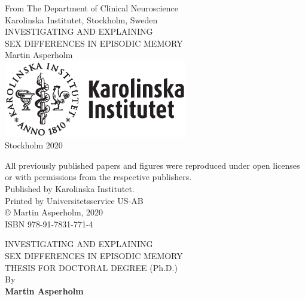 ﻿\documentclass[12pt,twoside,]{article}
\begin{document}
\sloppy %

\newpage
\thispagestyle{empty}
\begin{center}
\vspace*{25mm}
From The Department of Clinical Neuroscience \\
Karolinska Institutet, Stockholm, Sweden \\
\vspace{30mm}
{\Large INVESTIGATING AND EXPLAINING} \\
\vspace{2mm}
{\Large SEX DIFFERENCES IN EPISODIC MEMORY} \\
\vspace{5mm}
Martin Asperholm \\
\vspace{40mm}
\includegraphics[width=8cm]{Logo/KI-Logo_pos.eps} \\
Stockholm 2020
\end{center}

\newpage
\thispagestyle{empty}
\mbox{}
\vfill
\begin{flushleft}
	\noindent All previously published papers and figures were reproduced under open licenses or with permissions from the respective publishers. \\
	\vspace{2mm}
	\noindent Published by Karolinska Institutet. \\
	\vspace{2mm}
	\noindent Printed by Universitetsservice US-AB \\
	\vspace{2mm}
	\noindent © Martin Asperholm, 2020 \\
	\vspace{2mm}
	\noindent ISBN 978-91-7831-771-4
\end{flushleft}

\newpage
\thispagestyle{empty}
\vspace*{0mm}

\begin{flushleft}
	{\Large INVESTIGATING AND EXPLAINING \\ SEX DIFFERENCES IN EPISODIC MEMORY} \\
	\vspace{\baselineskip}
	{\Large THESIS FOR DOCTORAL DEGREE (Ph.D.)} \\
	\vspace{\baselineskip}
	By \\
	\vspace{\baselineskip}
	{\Large \bf{Martin Asperholm}}
\end{flushleft}
\vspace{\baselineskip}
\end{document}
